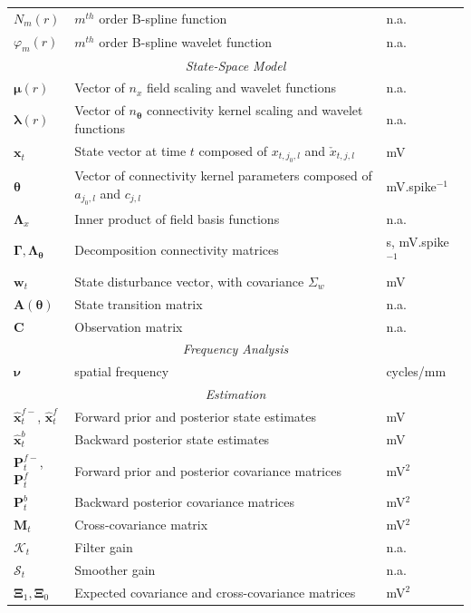 \documentclass[review,authoryear,3p]{elsarticle}
\begin{document}
\begin{table}[!t]
\begin{tabular}{|l|l|l|}
	$N_m(r)$&$m^{th}$ order B-spline function&n.a.\\
	$\varphi_m(r)$&$m^{th}$ order B-spline wavelet function&n.a.\\
	\hline
	\multicolumn{3}{|c|}{\emph{State-Space Model}} \\
	\hline
		$\boldsymbol\mu(r)$&Vector of $n_x$ field scaling and wavelet functions&n.a.\\
		$\boldsymbol\lambda(r)$&Vector of $n_{\boldsymbol\theta}$ connectivity kernel scaling and wavelet functions&n.a.\\
   	$\mathbf{x}_t$ & State vector at time $t$ composed of  $x_{t,j_{0},l}$ and $\check{x}_{t,j,l}$ & mV\\ 
		$\boldsymbol\theta$&Vector of connectivity kernel parameters composed of $a_{j_0,l}$ and $c_{j,l}$& mV.spike$^{-1}$\\ 
		$\boldsymbol{\Lambda}_x$&Inner product of field basis functions&n.a.\\
		$\boldsymbol\Gamma, \boldsymbol\Lambda_{\boldsymbol{\theta}}$&Decomposition connectivity matrices&s, mV.spike$^{-1}$\\
   	$\mathbf{w}_t$ & State disturbance vector, with covariance $\Sigma_w$ & mV\\ 
    $\mathbf{A}(\boldsymbol{\theta})$& State transition matrix& n.a.\\
   	$\mathbf{C}$ & Observation matrix & n.a. \\
	\hline
	\multicolumn{3}{|c|}{\emph{Frequency Analysis}} \\
	\hline
	$\boldsymbol{\nu}$& spatial frequency  & cycles/mm \\
	\hline
	\multicolumn{3}{|c|}{\emph{Estimation}} \\
	\hline
	$\hat{\mathbf{x}}_t^{f-}$, $\hat{\mathbf{x}}_t^f$ & Forward prior and posterior state estimates & mV\\
	$\hat{\mathbf{x}}_t^{b}$ & Backward posterior state estimates & mV\\
	$\mathbf P^{f-}_t$, $\mathbf P^f_t$  & Forward prior and posterior covariance matrices & mV$^2$\\
	$\mathbf P^b_t$ & Backward posterior covariance matrices & mV$^2$\\
	$\mathbf M_t$& Cross-covariance matrix & mV$^2$\\
	$\mathcal K_{t} $ & Filter gain & n.a.\\ 
	$\mathcal S_{t} $ & Smoother gain & n.a.\\ 
	$\boldsymbol\Xi_1, \boldsymbol\Xi_0$&Expected covariance and cross-covariance matrices& mV$^2$\\ 

\end{tabular}
\end{table}
\end{document}
